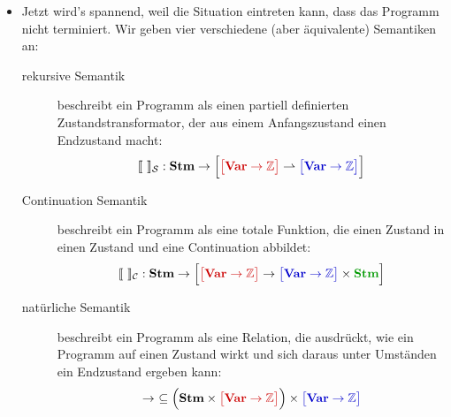 \documentclass[
  a4paper,
  11pt,
]{scrartcl}
\newcommand{\Z}{\mathbb{Z}}
\newcommand{\Cc}{\mathcal{C}}
\newcommand{\Sc}{\mathcal{S}}
\begin{document}
\begin{itemize}
  \item Jetzt wird's spannend, weil die Situation eintreten kann, dass das
    Programm nicht terminiert. Wir geben vier verschiedene (aber äquivalente)
    Semantiken an:
    \begin{description}
      \item[rekursive Semantik] beschreibt ein Programm als einen partiell
        definierten Zustandstransformator, der aus einem
        \textcolor{myred}{Anfangszustand} einen \textcolor{myblue}{Endzustand}
        macht:
        \begin{align*}
          \llbracket \ \rrbracket_{\Sc}:
          \textbf{Stm} \rightarrow
          \Big[
            \textcolor{myred}{\big[ \textbf{Var} \rightarrow \Z \big]}
            \rightharpoonup
            \textcolor{myblue}{\big[ \textbf{Var} \rightarrow \Z \big]}
          \Big]
        \end{align*}

      \item[Continuation Semantik] beschreibt ein Programm als eine totale
        Funktion, die einen \textcolor{myred}{Zustand} in einen
        \textcolor{myblue}{Zustand} und eine \textcolor{mygreen}{Continuation}
        abbildet:
        \begin{align*}
          \llbracket \ \rrbracket_{\Cc}:
          \textbf{Stm} \rightarrow
          \Big[
            \textcolor{myred}{\big[ \textbf{Var} \rightarrow \Z \big]}
            \rightarrow
            \textcolor{myblue}{\big[ \textbf{Var} \rightarrow \Z \big]}
            \times
            \textcolor{mygreen}{\textbf{Stm}}
          \Big]
        \end{align*}

      \item[natürliche Semantik] beschreibt ein Programm als eine Relation, die
        ausdrückt, wie ein Programm auf einen \textcolor{myred}{Zustand} wirkt
        und sich daraus unter Umständen ein \textcolor{myblue}{Endzustand}
        ergeben kann:
        \begin{align*}
          \rightarrow \ \subseteq
          \Big(
          \textbf{Stm}
          \times
          \textcolor{myred}{\big[ \textbf{Var} \rightarrow \Z \big]}
          \Big)
          \times
          \textcolor{myblue}{\big[ \textbf{Var} \rightarrow \Z \big]}
        \end{align*}


\end{description}
\end{itemize}
\end{document}
